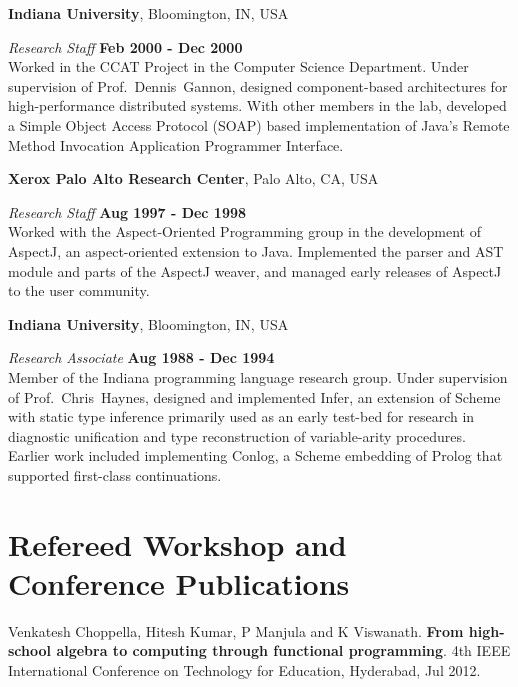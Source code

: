 \documentclass[11pt,margin,line]{res}
\begin{document}
\begin{resume}
{\bf Indiana University}, Bloomington, IN, USA

\vspace{-.5cm}

{\em Research Staff\/} \hfill {\bf Feb 2000 - Dec 2000}\\ Worked
in the CCAT Project in the Computer Science Department.  Under
supervision of Prof.~Dennis~Gannon, designed component-based
architectures for high-performance distributed systems.  With
other members in the lab, developed a Simple Object Access
Protocol (SOAP) based implementation of Java's Remote Method
Invocation  Application Programmer Interface. 

{\bf Xerox Palo Alto Research Center}, Palo Alto, CA, USA

\vspace{-.5cm}

{\em Research Staff\/} \hfill {\bf Aug 1997 - Dec 1998}\\ 
Worked with the Aspect-Oriented Programming group in the
development of AspectJ, an aspect-oriented extension to
Java.  Implemented the parser and AST module and parts of the
AspectJ weaver, and managed early releases of AspectJ to the
user community.

{\bf Indiana University}, Bloomington, IN, USA

\vspace{-.5cm}

{\em Research Associate\/} \hfill {\bf Aug 1988 - Dec 1994}\\
 Member of the Indiana programming language research group.
 Under supervision of Prof.~Chris~Haynes, designed and
 implemented Infer, an extension of Scheme with static type
 inference primarily used as an early test-bed for research in
 diagnostic unification and type reconstruction of
 variable-arity procedures.  Earlier work included implementing
 Conlog, a Scheme embedding of Prolog that supported first-class
 continuations.


\newpage

\section{\sc Refereed Workshop and Conference Publications}

Venkatesh Choppella, Hitesh Kumar, P Manjula and K
Viswanath.  {\bf From high-school algebra to computing
  through functional programming}.  4th IEEE International
Conference on Technology for Education, Hyderabad, Jul 2012.


\end{resume}
\end{document}
